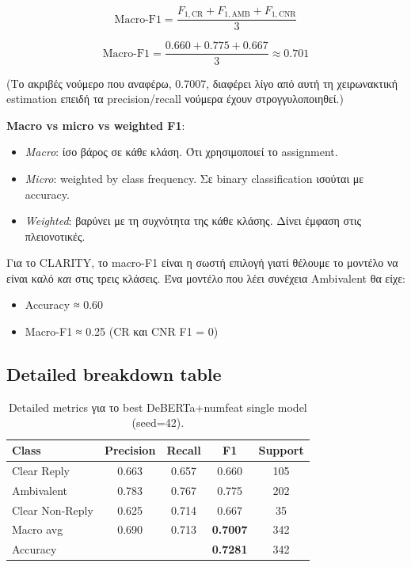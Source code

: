 \documentclass[12pt]{fphw}
\begin{document}
\[
\text{Macro-F1} = \frac{F_{1,\text{CR}} + F_{1,\text{AMB}} + F_{1,\text{CNR}}}{3}
\]

\[
\text{Macro-F1} = \frac{0.660 + 0.775 + 0.667}{3} \approx 0.701
\]

(Το ακριβές νούμερο που αναφέρω, 0.7007, διαφέρει λίγο από αυτή τη χειρωνακτική estimation επειδή τα precision/recall νούμερα έχουν στρογγυλοποιηθεί.)

\textbf{Macro vs micro vs weighted F1}:
\begin{itemize}
    \item \emph{Macro}: ίσο βάρος σε κάθε κλάση. Ότι χρησιμοποιεί το assignment.
    \item \emph{Micro}: weighted by class frequency. Σε binary classification ισούται με accuracy.
    \item \emph{Weighted}: βαρύνει με τη συχνότητα της κάθε κλάσης. Δίνει έμφαση στις πλειονοτικές.
\end{itemize}

Για το CLARITY, το macro-F1 είναι η σωστή επιλογή γιατί θέλουμε το μοντέλο να είναι καλό \emph{και} στις τρεις κλάσεις. Ένα μοντέλο που λέει συνέχεια Ambivalent θα είχε:
\begin{itemize}
    \item Accuracy ≈ 0.60
    \item Macro-F1 ≈ 0.25 (CR και CNR F1 = 0)
\end{itemize}

\subsection{Detailed breakdown table}

\begin{table}[H]
\centering
\begin{tabular}{lcccc}
\toprule
Class & Precision & Recall & F1 & Support \\
\midrule
Clear Reply & 0.663 & 0.657 & 0.660 & 105 \\
Ambivalent & 0.783 & 0.767 & 0.775 & 202 \\
Clear Non-Reply & 0.625 & 0.714 & 0.667 & 35 \\
\midrule
Macro avg & 0.690 & 0.713 & \textbf{0.7007} & 342 \\
Accuracy & & & \textbf{0.7281} & 342 \\
\bottomrule
\end{tabular}
\caption{Detailed metrics για το best DeBERTa+numfeat single model (seed=42).}
\label{tab:detailed_metrics}
\end{table}
\end{document}
